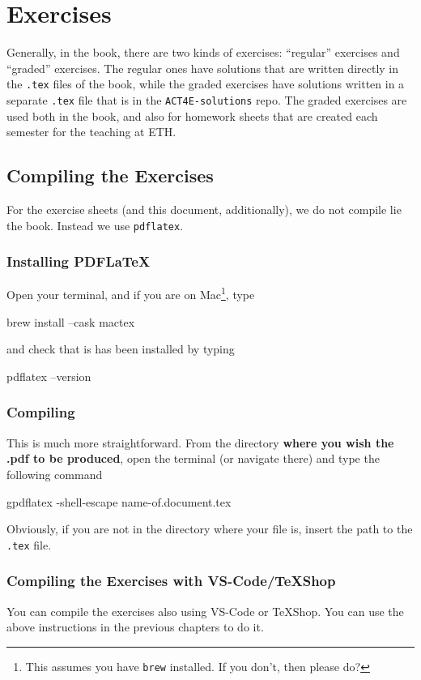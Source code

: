 \documentclass{article}
\begin{document}
    \section{Exercises}
    Generally, in the book, there are two kinds of exercises: “regular” exercises and “graded” exercises.
    The regular ones have solutions that are written directly in the \texttt{.tex} files of the book, while the graded exercises have solutions written in a separate \texttt{.tex} file that is in the \texttt{ACT4E-solutions} repo.
    The graded exercises are used both in the book, and also for homework sheets that are created each semester for the teaching at ETH.

    \subsection{Compiling the Exercises}

    For the exercise sheets (and this document, additionally), we do not compile lie the book.
    Instead we use \texttt{pdflatex}.
    \subsubsection{Installing PDFLaTeX}
    Open your terminal, and if you are on Mac\footnote{This assumes you have \texttt{brew} installed.
        If you don't, then please do?}, type
    \begin{bashcode}
        brew install --cask mactex
    \end{bashcode}
    and check that is has been installed by typing
    \begin{bashcode}
        pdflatex --version
    \end{bashcode}
    \subsubsection{Compiling}
    This is much more straightforward.
    From the directory \textbf{where you wish the .pdf to be produced}, open the terminal (or navigate there) and type the following command
    \begin{bashcode}
        gpdflatex -shell-escape name-of.document.tex
    \end{bashcode}
    Obviously, if you are not in the directory where your file is, insert the path to the \texttt{.tex} file.

    \subsubsection{Compiling the Exercises with VS-Code/TeXShop}
    You can compile the exercises also using VS-Code or TeXShop.
    You can use the above instructions in the previous chapters to do it.
    \newpage
\end{document}
